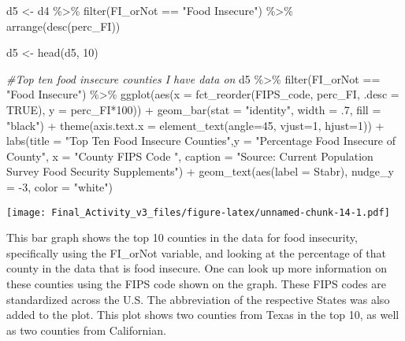 \documentclass[
]{article}
\newenvironment{Shaded}{\begin{snugshade}}{\end{snugshade}}
\newcommand{\AttributeTok}[1]{\textcolor[rgb]{0.77,0.63,0.00}{#1}}
\newcommand{\CommentTok}[1]{\textcolor[rgb]{0.56,0.35,0.01}{\textit{#1}}}
\newcommand{\ConstantTok}[1]{\textcolor[rgb]{0.00,0.00,0.00}{#1}}
\newcommand{\DecValTok}[1]{\textcolor[rgb]{0.00,0.00,0.81}{#1}}
\newcommand{\FunctionTok}[1]{\textcolor[rgb]{0.00,0.00,0.00}{#1}}
\newcommand{\NormalTok}[1]{#1}
\newcommand{\OtherTok}[1]{\textcolor[rgb]{0.56,0.35,0.01}{#1}}
\newcommand{\SpecialCharTok}[1]{\textcolor[rgb]{0.00,0.00,0.00}{#1}}
\newcommand{\StringTok}[1]{\textcolor[rgb]{0.31,0.60,0.02}{#1}}
\begin{document}
\begin{Shaded}
\begin{Highlighting}[]
\NormalTok{d5 }\OtherTok{\textless{}{-}}\NormalTok{ d4 }\SpecialCharTok{\%\textgreater{}\%} \FunctionTok{filter}\NormalTok{(FI\_orNot }\SpecialCharTok{==} \StringTok{"Food Insecure"}\NormalTok{) }\SpecialCharTok{\%\textgreater{}\%} \FunctionTok{arrange}\NormalTok{(}\FunctionTok{desc}\NormalTok{(perc\_FI))}

\NormalTok{d5 }\OtherTok{\textless{}{-}} \FunctionTok{head}\NormalTok{(d5, }\DecValTok{10}\NormalTok{)}

\CommentTok{\#Top ten food insecure counties I have data on}
\NormalTok{d5 }\SpecialCharTok{\%\textgreater{}\%} \FunctionTok{filter}\NormalTok{(FI\_orNot }\SpecialCharTok{==} \StringTok{"Food Insecure"}\NormalTok{) }\SpecialCharTok{\%\textgreater{}\%} 
  \FunctionTok{ggplot}\NormalTok{(}\FunctionTok{aes}\NormalTok{(}\AttributeTok{x =} \FunctionTok{fct\_reorder}\NormalTok{(FIPS\_code, perc\_FI, }\AttributeTok{.desc =} \ConstantTok{TRUE}\NormalTok{), }\AttributeTok{y =}\NormalTok{ perc\_FI}\SpecialCharTok{*}\DecValTok{100}\NormalTok{)) }\SpecialCharTok{+}
  \FunctionTok{geom\_bar}\NormalTok{(}\AttributeTok{stat =} \StringTok{"identity"}\NormalTok{, }\AttributeTok{width =}\NormalTok{ .}\DecValTok{7}\NormalTok{, }\AttributeTok{fill =} \StringTok{"black"}\NormalTok{) }\SpecialCharTok{+}
  \FunctionTok{theme}\NormalTok{(}\AttributeTok{axis.text.x =} \FunctionTok{element\_text}\NormalTok{(}\AttributeTok{angle=}\DecValTok{45}\NormalTok{, }\AttributeTok{vjust=}\DecValTok{1}\NormalTok{, }\AttributeTok{hjust=}\DecValTok{1}\NormalTok{)) }\SpecialCharTok{+}
  \FunctionTok{labs}\NormalTok{(}\AttributeTok{title =} \StringTok{"Top Ten Food Insecure Counties"}\NormalTok{,}\AttributeTok{y =} \StringTok{"Percentage Food Insecure of County"}\NormalTok{,}
       \AttributeTok{x =} \StringTok{"County FIPS Code "}\NormalTok{,}
       \AttributeTok{caption =} \StringTok{"Source: Current Population Survey Food Security Supplements"}\NormalTok{) }\SpecialCharTok{+}
  \FunctionTok{geom\_text}\NormalTok{(}\FunctionTok{aes}\NormalTok{(}\AttributeTok{label =}\NormalTok{ Stabr), }\AttributeTok{nudge\_y =} \SpecialCharTok{{-}}\DecValTok{3}\NormalTok{, }\AttributeTok{color =} \StringTok{"white"}\NormalTok{)}
\end{Highlighting}
\end{Shaded}

\texttt{[image: Final\_Activity\_v3\_files/figure-latex/unnamed-chunk-14-1.pdf]}

This bar graph shows the top 10 counties in the data for food
insecurity, specifically using the FI\_orNot variable, and looking at
the percentage of that county in the data that is food insecure. One can
look up more information on these counties using the FIPS code shown on
the graph. These FIPS codes are standardized across the U.S. The
abbreviation of the respective States was also added to the plot. This
plot shows two counties from Texas in the top 10, as well as two
counties from Californian.
\end{document}
